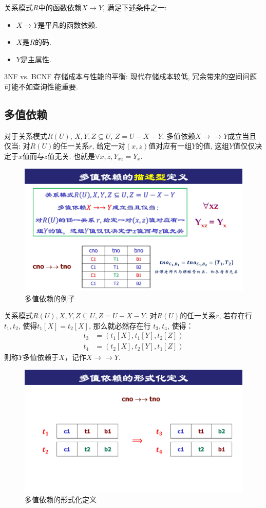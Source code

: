 \begin{definition}[3NF]
  关系模式$R$中的函数依赖$X\to Y$, 满足下述条件之一:
  \begin{itemize}
    \item $X\to Y$是平凡的函数依赖.
    \item $X$是$R$的码.
    \item $Y$是主属性.
  \end{itemize}
\end{definition}

3NF vs. BCNF\quad
存储成本与性能的平衡: 现代存储成本较低, 冗余带来的空间问题可能不如查询性能重要.

\subsection{多值依赖}

\begin{definition}[多值依赖的描述型定义]
  对于关系模式$R(U)$, $X,Y,Z\subseteq U$, $Z=U-X-Y$. 多值依赖$X\to\to Y$成立当且仅当:
  对$R(U)$的任一关系$r$, 给定一对$(x,z)$值对应有一组$Y$的值, 这组$Y$值仅仅决定于$x$值而与$z$值无关. 也就是$\forall x,z, Y_{xz} = Y_x$.
\end{definition}

\begin{figure}[H]
    \centering
    \includegraphics[width=.4\textwidth]{./figure/多值依赖.pdf}
    \caption{多值依赖的例子}
\end{figure}

\begin{definition}[多值依赖的形式化定义]
  关系模式$R(U), X, Y, Z \subseteq U, Z = U - X - Y$.
  对$R(U)$的任一关系$r$, 若存在行$t_1, t_2$, 使得$t_1[X] = t_2[X]$,
  那么就必然存在行 $t_3, t_4$, 使得：
  \begin{align*}
    t_3 &= (t_1[X], t_1[Y], t_2[Z]) \\
    t_4 &= (t_2[X], t_2[Y], t_1[Z]) 
  \end{align*}
  则称$Y$多值依赖于$X$，记作$X \to\to Y$.
\end{definition}

\begin{figure}[H]
    \centering
    \includegraphics[width=.7\textwidth]{./figure/多值依赖的形式化定义.pdf}
    \caption{多值依赖的形式化定义}
\end{figure}


